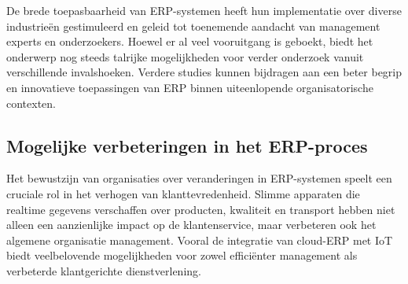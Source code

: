 De brede toepasbaarheid van ERP-systemen heeft hun implementatie over diverse industrieën gestimuleerd en geleid tot toenemende aandacht van management experts en onderzoekers. Hoewel er al veel vooruitgang is geboekt, biedt het onderwerp nog steeds talrijke mogelijkheden voor verder onderzoek vanuit verschillende invalshoeken. Verdere studies kunnen bijdragen aan een beter begrip en innovatieve toepassingen van ERP binnen uiteenlopende organisatorische contexten. \autocite{sheik2020enterprise}










\subsection{Mogelijke verbeteringen in het ERP-proces}
\label{sec:Mogelijke verbeteringen in het ERP-procesBP}

Het bewustzijn van organisaties over veranderingen in ERP-systemen speelt een cruciale rol in het verhogen van klanttevredenheid. Slimme apparaten die realtime gegevens verschaffen over producten, kwaliteit en transport hebben niet alleen een aanzienlijke impact op de klantenservice, maar verbeteren ook het algemene organisatie management. Vooral de integratie van cloud-ERP met IoT biedt veelbelovende mogelijkheden voor zowel efficiënter management als verbeterde klantgerichte dienstverlening. \autocite{tavana2020iot}

\vspace{\baselineskip}



